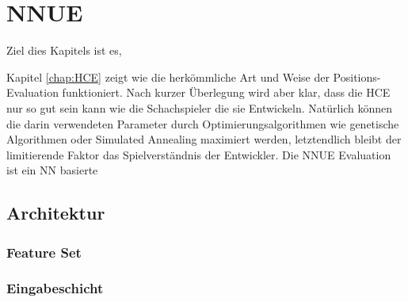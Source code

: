 \chapter{NNUE}

Ziel dies Kapitels ist es, 

Kapitel \autoref{chap:HCE} zeigt wie die herkömmliche Art und Weise der Positions-Evaluation funktioniert. Nach kurzer Überlegung wird aber klar, dass die \ac{HCE} nur so gut sein kann wie die Schachspieler die sie Entwickeln. Natürlich können die darin verwendeten Parameter durch Optimierungsalgorithmen wie genetische Algorithmen oder Simulated Annealing maximiert werden, letztendlich bleibt der limitierende Faktor das Spielverständnis der Entwickler. Die \ac{NNUE} Evaluation ist ein \ac{NN} basierte 


\section{Architektur}



\subsection{Feature Set}
\label{chap:featureSet}



\subsection{Eingabeschicht}

